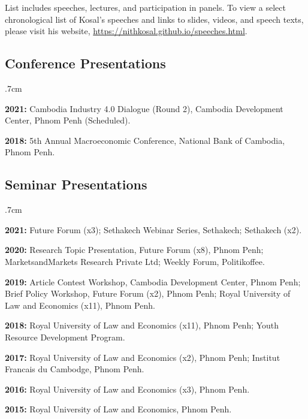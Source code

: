 \documentclass[10pt,a4paper]{article}
\begin{document}
\noindent List includes speeches, lectures, and participation in panels. To view a select chronological list of Kosal's speeches and links to slides, videos, and speech texts, please visit his website, \url{https://nithkosal.github.io/speeches.html}.

\vspace{-0.5em}
	
	\subsection*{Conference Presentations}
		\vspace{-1em}
			\begin{adjustwidth}{.7cm}{}
				\item \textbf{2021:} Cambodia Industry 4.0 Dialogue (Round 2), Cambodia Development Center, Phnom Penh (Scheduled).
				 
				\item \textbf{2018:} 5th Annual Macroeconomic Conference, National Bank of Cambodia, Phnom Penh. 
			\end{adjustwidth}		
	
	\subsection*{Seminar Presentations}
			\vspace{-1em}
			\begin{adjustwidth}{.7cm}{}
				\item \textbf{2021:} Future Forum (x3); Sethakech Webinar Series, Sethakech; Sethakech (x2). 
								
				\item \textbf{2020:} Research Topic Presentation, Future Forum (x8), Phnom Penh; MarketsandMarkets Research Private Ltd; Weekly Forum, Politikoffee. 
				
				\item \textbf{2019:} Article Contest Workshop, Cambodia Development Center, Phnom Penh; Brief Policy Workshop, Future Forum (x2), Phnom Penh; Royal University of Law and Economics (x11), Phnom Penh.
		
				\item \textbf{2018:} Royal University of Law and Economics (x11), Phnom Penh; Youth Resource Development Program.
		
				\item \textbf{2017:} Royal University of Law and Economics (x2), Phnom Penh; Institut Francais du Cambodge, Phnom Penh.
		
				\item \textbf{2016:} Royal University of Law and Economics (x3), Phnom Penh.
		
				\item  \textbf{2015:} Royal University of Law and Economics, Phnom Penh.
			\end{adjustwidth}
\end{document}
